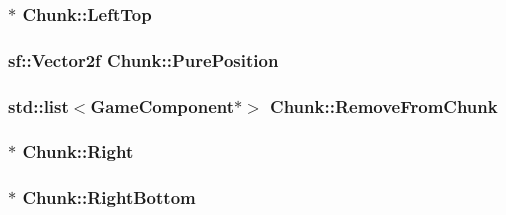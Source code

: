 \hypertarget{class_chunk_a877d51226eaa97c40c05223987514d59}{
\subsubsection[{Left\-Top}]{$\ast$ Chunk\-::\-Left\-Top\hspace{0.3cm}{\ttfamily [protected]}}}\label{class_chunk_a877d51226eaa97c40c05223987514d59}
\hypertarget{class_chunk_ace1577872b1189bc7fd88a9b3817ce98}{
\subsubsection[{Pure\-Position}]{\setlength{\rightskip}{0pt plus 5cm}sf\-::\-Vector2f Chunk\-::\-Pure\-Position\hspace{0.3cm}{\ttfamily [private]}}}\label{class_chunk_ace1577872b1189bc7fd88a9b3817ce98}
\hypertarget{class_chunk_adf6692fdab4518524e217cc0ef09d282}{
\subsubsection[{Remove\-From\-Chunk}]{\setlength{\rightskip}{0pt plus 5cm}std\-::list$<${\bf Game\-Component}$\ast$$>$ Chunk\-::\-Remove\-From\-Chunk\hspace{0.3cm}{\ttfamily [protected]}}}\label{class_chunk_adf6692fdab4518524e217cc0ef09d282}
\hypertarget{class_chunk_a0bcf134e2aba0ca49370272c2b3f17a4}{
\subsubsection[{Right}]{$\ast$ Chunk\-::\-Right\hspace{0.3cm}{\ttfamily [protected]}}}\label{class_chunk_a0bcf134e2aba0ca49370272c2b3f17a4}
\hypertarget{class_chunk_afded01a9a67540c9f64dde5776021f4b}{
\subsubsection[{Right\-Bottom}]{$\ast$ Chunk\-::\-Right\-Bottom\hspace{0.3cm}{\ttfamily [protected]}}}\label{class_chunk_afded01a9a67540c9f64dde5776021f4b}
